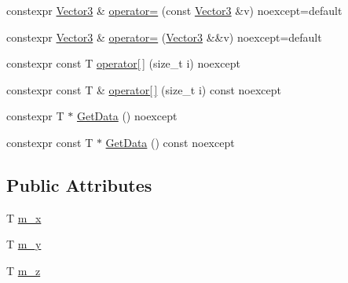 \begin{DoxyCompactItemize}
\item 
constexpr \hyperlink{structmage_1_1_vector3}{Vector3} \& \hyperlink{structmage_1_1_vector3_3_01_t_00_01typename_01std_1_1enable__if__t_3_01std_1_1is__arithmetic__v_3_01_t_01_4_00_01void_01_4_01_4_aea3b9f40f77d37ac6fcdb86cc444855e}{operator=} (const \hyperlink{structmage_1_1_vector3}{Vector3} \&v) noexcept=default
\item 
constexpr \hyperlink{structmage_1_1_vector3}{Vector3} \& \hyperlink{structmage_1_1_vector3_3_01_t_00_01typename_01std_1_1enable__if__t_3_01std_1_1is__arithmetic__v_3_01_t_01_4_00_01void_01_4_01_4_a844583be5dde6efeffec03590df850be}{operator=} (\hyperlink{structmage_1_1_vector3}{Vector3} \&\&v) noexcept=default
\item 
constexpr const T \hyperlink{structmage_1_1_vector3_3_01_t_00_01typename_01std_1_1enable__if__t_3_01std_1_1is__arithmetic__v_3_01_t_01_4_00_01void_01_4_01_4_aa28ff8f5cf16b88da29281ad7b4de202}{operator\mbox{[}$\,$\mbox{]}} (size\+\_\+t i) noexcept
\item 
constexpr const T \& \hyperlink{structmage_1_1_vector3_3_01_t_00_01typename_01std_1_1enable__if__t_3_01std_1_1is__arithmetic__v_3_01_t_01_4_00_01void_01_4_01_4_a26e4b66d02117fdc6df127f83b099c9c}{operator\mbox{[}$\,$\mbox{]}} (size\+\_\+t i) const noexcept
\item 
constexpr T $\ast$ \hyperlink{structmage_1_1_vector3_3_01_t_00_01typename_01std_1_1enable__if__t_3_01std_1_1is__arithmetic__v_3_01_t_01_4_00_01void_01_4_01_4_a126f56252c9621850e4b857efc390ba2}{Get\+Data} () noexcept
\item 
constexpr const T $\ast$ \hyperlink{structmage_1_1_vector3_3_01_t_00_01typename_01std_1_1enable__if__t_3_01std_1_1is__arithmetic__v_3_01_t_01_4_00_01void_01_4_01_4_a9565d50c89cae32d0219c2afae663f3f}{Get\+Data} () const noexcept
\end{DoxyCompactItemize}
\subsection*{Public Attributes}
\begin{DoxyCompactItemize}
\item 
T \hyperlink{structmage_1_1_vector3_3_01_t_00_01typename_01std_1_1enable__if__t_3_01std_1_1is__arithmetic__v_3_01_t_01_4_00_01void_01_4_01_4_ab495c6012997584b577b5cc55299c981}{m\+\_\+x}
\item 
T \hyperlink{structmage_1_1_vector3_3_01_t_00_01typename_01std_1_1enable__if__t_3_01std_1_1is__arithmetic__v_3_01_t_01_4_00_01void_01_4_01_4_af516e5a5374c3fd193ed43819b447d79}{m\+\_\+y}
\item 
T \hyperlink{structmage_1_1_vector3_3_01_t_00_01typename_01std_1_1enable__if__t_3_01std_1_1is__arithmetic__v_3_01_t_01_4_00_01void_01_4_01_4_aaded1e162ec0b3c6a79d0a010b36f30c}{m\+\_\+z}
\end{DoxyCompactItemize}


